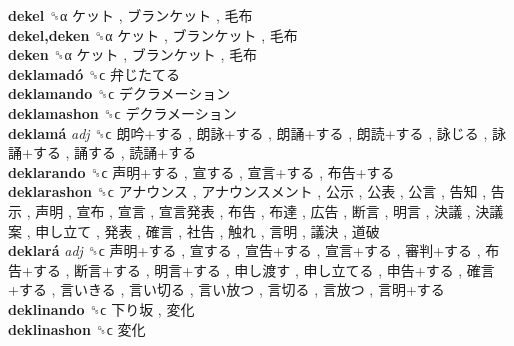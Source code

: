 \textbf{dekel} ␝α   ケット ,  ブランケット ,  毛布   \\
\textbf{dekel,deken} ␝α   ケット ,  ブランケット ,  毛布   \\
\textbf{deken} ␝α   ケット ,  ブランケット ,  毛布   \\
\textbf{deklamadó} ␝ϲ   弁じたてる   \\
\textbf{deklamando} ␝ϲ   デクラメーション   \\
\textbf{deklamashon} ␝ϲ   デクラメーション   \\
\textbf{deklamá} \emph{adj}  ␝ϲ   朗吟+する ,  朗詠+する ,  朗誦+する ,  朗読+する ,  詠じる ,  詠誦+する ,  誦する ,  読誦+する   \\
\textbf{deklarando} ␝ϲ   声明+する ,  宣する ,  宣言+する ,  布告+する   \\
\textbf{deklarashon} ␝ϲ   アナウンス ,  アナウンスメント ,  公示 ,  公表 ,  公言 ,  告知 ,  告示 ,  声明 ,  宣布 ,  宣言 ,  宣言発表 ,  布告 ,  布達 ,  広告 ,  断言 ,  明言 ,  決議 ,  決議案 ,  申し立て ,  発表 ,  確言 ,  社告 ,  触れ ,  言明 ,  議決 ,  道破   \\
\textbf{deklará} \emph{adj}  ␝ϲ   声明+する ,  宣する ,  宣告+する ,  宣言+する ,  審判+する ,  布告+する ,  断言+する ,  明言+する ,  申し渡す ,  申し立てる ,  申告+する ,  確言+する ,  言いきる ,  言い切る ,  言い放つ ,  言切る ,  言放つ ,  言明+する   \\
\textbf{deklinando} ␝ϲ   下り坂 ,  変化   \\
\textbf{deklinashon} ␝ϲ   変化   \\
